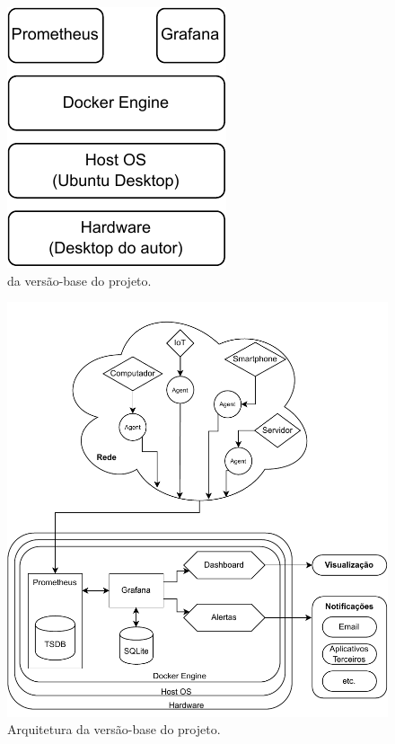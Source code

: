 \begin{figure}[H]
\centering
\includegraphics[scale=0.97]{Imagens/chap03/v3_stack.pdf}
\caption{ da versão-base do projeto.}
\label{fig:StackBase}
\end{figure}
\begin{figure}[H]
\centering
\includegraphics[scale=0.98]{Imagens/chap03/v3_diagram.pdf}
\caption{Arquitetura da versão-base do projeto.}
\label{fig:ArquiteturaBase}
\end{figure}

